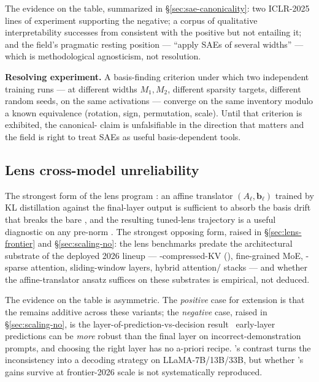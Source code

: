 The evidence on the table, summarized in \S\ref{sec:sae-canonicality}:
two ICLR-2025 lines of experiment supporting the negative; a corpus of
qualitative interpretability successes from
\citet{templeton2024-scaling-monosemanticity} consistent with the
positive but not entailing it; and the field's pragmatic resting
position --- ``apply SAEs of several widths''
\citep[\S 1]{leask2025-sae-not-canonical} --- which is methodological
agnosticism, not resolution.

\textbf{Resolving experiment.} A basis-finding criterion under which two
independent  training runs --- at different widths $M_1, M_2$,
different sparsity targets, different random seeds, on the same
activations --- converge on the same  inventory modulo a known
equivalence (rotation, sign, permutation, scale). Until that criterion
is exhibited, the canonical- claim is unfalsifiable in the
direction that matters and the field is right to treat SAEs as useful
basis-dependent tools.

\subsection{Lens cross-model unreliability}
\label{sec:contradictions-lens}

The strongest form of the lens program
\citep{belrose2023-tuned-lens}: an affine translator
$(A_\ell, \mathbf{b}_\ell)$ trained by KL distillation against the
final-layer output is sufficient to absorb the basis drift that breaks
the bare , and the resulting tuned-lens trajectory is a
useful diagnostic on any pre-norm . The strongest opposing
form, raised in \S\ref{sec:lens-frontier} and \S\ref{sec:scaling-no}:
the lens benchmarks predate the architectural substrate of the deployed
2026 lineup --- -compressed-KV (), fine-grained MoE,
-sparse attention, sliding-window layers, hybrid attention/
stacks --- and whether the affine-translator ansatz suffices on these
substrates is empirical, not deduced.

The evidence on the table is asymmetric. The \emph{positive} case for
extension is that the  remains additive across these
variants; the \emph{negative} case, raised in
\S\ref{sec:scaling-no}, is the
\citet{halawi2023-overthinking} layer-of-prediction-vs-decision result
\textemdash\ early-layer predictions can be \emph{more} robust than the
final layer on incorrect-demonstration prompts, and choosing the right
layer has no a-priori recipe. \citet{chuang2023-dola}'s  contrast
turns the inconsistency into a decoding strategy on
LLaMA-7B/13B/33B, but whether 's gains survive at frontier-2026
scale is not systematically reproduced.

